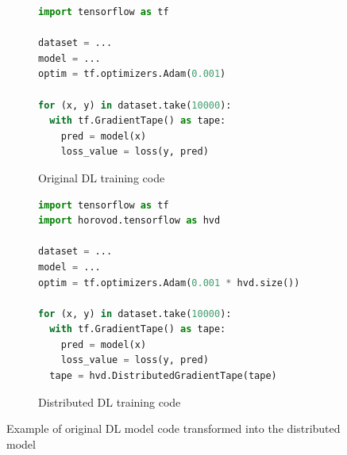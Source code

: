 
\pagebreak
\begin{figure}[ht!]
  \centering
  \begin{subfigure}[t]{0.48\textwidth}
    \begin{lstlisting}[language=Python]
import tensorflow as tf

dataset = ...
model = ...
optim = tf.optimizers.Adam(0.001) 

for (x, y) in dataset.take(10000):
  with tf.GradientTape() as tape:
    pred = model(x)
    loss_value = loss(y, pred)\end{lstlisting} 
    \caption{Original DL training code}
  \end{subfigure}
  \hspace{5mm}
  \begin{subfigure}[t]{0.48\textwidth}
    \begin{lstlisting}[language=Python]
import tensorflow as tf
import horovod.tensorflow as hvd

dataset = ...
model = ...
optim = tf.optimizers.Adam(0.001 * hvd.size()) 

for (x, y) in dataset.take(10000):
  with tf.GradientTape() as tape:
    pred = model(x)
    loss_value = loss(y, pred) 
  tape = hvd.DistributedGradientTape(tape)\end{lstlisting}
    \caption{Distributed DL training code}
  \end{subfigure}
  \caption{Example of original DL model code transformed into the distributed model}
  \label{fig:trans:ex}
\end{figure}

